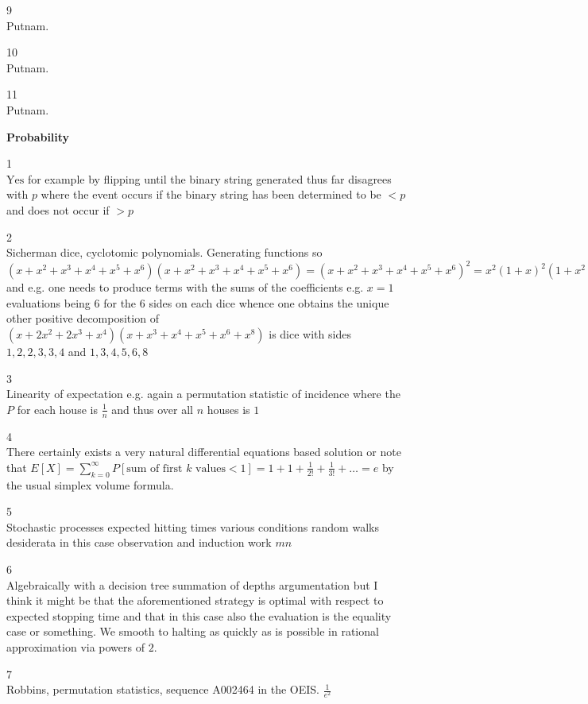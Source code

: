 9 \\
Putnam.

10 \\
Putnam.

11 \\
Putnam.

\newpage

\textbf{Probability}

1 \\
$\boxed{\text{Yes}}$ for example by flipping until the binary string generated thus far disagrees with $p$ where the event occurs if the binary string has been determined to be $<p$ and does not occur if $>p$

2 \\
Sicherman dice, cyclotomic polynomials. Generating functions so $(x+x^2+x^3+x^4+x^5+x^6)(x+x^2+x^3+x^4+x^5+x^6)=(x+x^2+x^3+x^4+x^5+x^6)^2=x^2(1+x)^2(1+x^2+x^4)^2=x^2(1+x)^2(1+x+x^2)^2(1-x+x^2)^2$ and e.g. one needs to produce terms with the sums of the coefficients e.g. $x=1$ evaluations being $6$ for the $6$ sides on each dice whence one obtains the unique other positive decomposition of $(x+2x^2+2x^3+x^4)(x+x^3+x^4+x^5+x^6+x^8)$ is dice with sides $1,2,2,3,3,4$ and $1,3,4,5,6,8$

3 \\
Linearity of expectation e.g. again a permutation statistic of incidence where the $P$ for each house is $\frac{1}{n}$ and thus over all $n$ houses is $\boxed{1}$

4 \\
There certainly exists a very natural differential equations based solution or note that $E[X]=\sum_{k=0}^{\infty} P[\text{sum of first }k\text{ values}<1]=1+1+\frac{1}{2!}+\frac{1}{3!}+\dots=\boxed{e}$ by the usual simplex volume formula.

5 \\
Stochastic processes expected hitting times various conditions random walks desiderata in this case observation and induction work $\boxed{mn}$

6 \\
Algebraically with a decision tree summation of depths argumentation but I think it might be that the aforementioned strategy is optimal with respect to expected stopping time and that in this case also the evaluation is the equality case or something. We smooth to halting as quickly as is possible in rational approximation via powers of $2$.

7 \\
Robbins, permutation statistics, sequence A002464 in the OEIS. $\boxed{\frac{1}{e^2}}$

